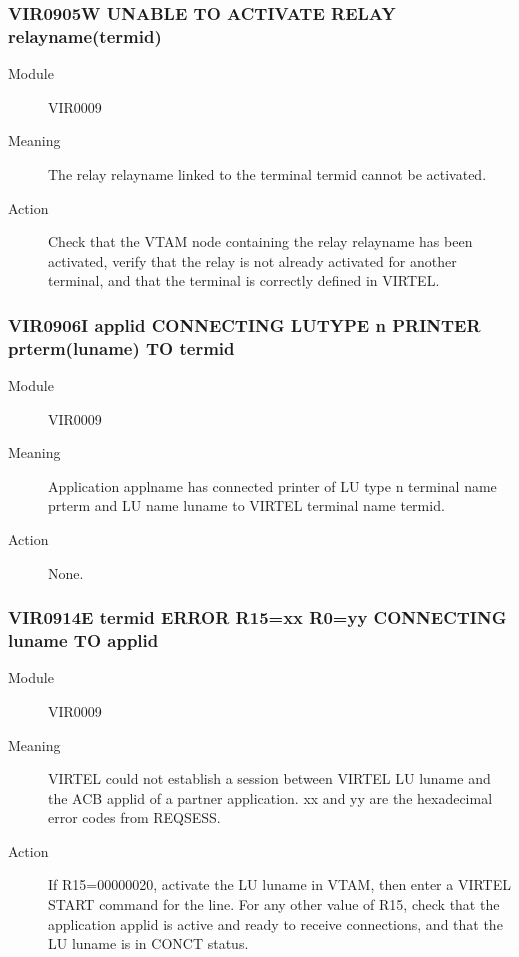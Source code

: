 \documentclass[letterpaper,10pt,english]{sphinxmanual}
\begin{document}
\subsubsection{VIR0905W UNABLE TO ACTIVATE RELAY relayname(termid)}
\label{\detokenize{messages:vir0905w-unable-to-activate-relay-relayname-termid}}\begin{description}
\item[{Module}] \leavevmode
VIR0009

\item[{Meaning}] \leavevmode
The relay relayname linked to the terminal termid cannot be activated.

\item[{Action}] \leavevmode
Check that the VTAM node containing the relay relayname has been activated, verify that the relay is not already activated for another terminal, and that the terminal is correctly defined in VIRTEL.

\end{description}


\subsubsection{VIR0906I applid CONNECTING LUTYPE n PRINTER prterm(luname) TO termid}
\label{\detokenize{messages:vir0906i-applid-connecting-lutype-n-printer-prterm-luname-to-termid}}\begin{description}
\item[{Module}] \leavevmode
VIR0009

\item[{Meaning}] \leavevmode
Application applname has connected printer of LU type n terminal name prterm and LU name luname to VIRTEL terminal name termid.

\item[{Action}] \leavevmode
None.

\end{description}


\subsubsection{VIR0914E termid ERROR R15=xx R0=yy CONNECTING luname TO applid}
\label{\detokenize{messages:vir0914e-termid-error-r15-xx-r0-yy-connecting-luname-to-applid}}\begin{description}
\item[{Module}] \leavevmode
VIR0009

\item[{Meaning}] \leavevmode
VIRTEL could not establish a session between VIRTEL LU luname and the ACB applid of a partner application. xx and yy are the hexadecimal error codes from REQSESS.

\item[{Action}] \leavevmode
If R15=00000020, activate the LU luname in VTAM, then enter a VIRTEL START command for the line. For any other value of R15, check that the application applid is active and ready to receive connections, and that the LU luname is in CONCT status.

\end{description}
\end{document}

